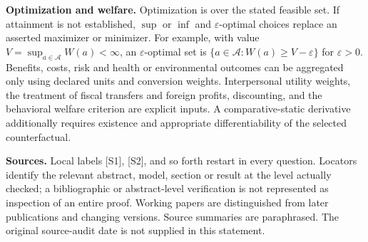 \documentclass[11pt,a4paper]{article}
\begin{document}
\textbf{Optimization and welfare.} Optimization is over the stated feasible set. If attainment is not established, $\sup$ or $\inf$ and $\varepsilon$-optimal choices replace an asserted maximizer or minimizer. For example, with value $V=\sup_{a\in\mathcal A}W(a)<\infty$, an $\varepsilon$-optimal set is $\{a\in\mathcal A:W(a)\geq V-\varepsilon\}$ for $\varepsilon>0$. Benefits, costs, risk and health or environmental outcomes can be aggregated only using declared units and conversion weights. Interpersonal utility weights, the treatment of fiscal transfers and foreign profits, discounting, and the behavioral welfare criterion are explicit inputs. A comparative-static derivative additionally requires existence and appropriate differentiability of the selected counterfactual.

\textbf{Sources.} Local labels [S1], [S2], and so forth restart in every question. Locators identify the relevant abstract, model, section or result at the level actually checked; a bibliographic or abstract-level verification is not represented as inspection of an entire proof. Working papers are distinguished from later publications and changing versions. Source summaries are paraphrased. The original source-audit date is not supplied in this statement.
\end{document}
